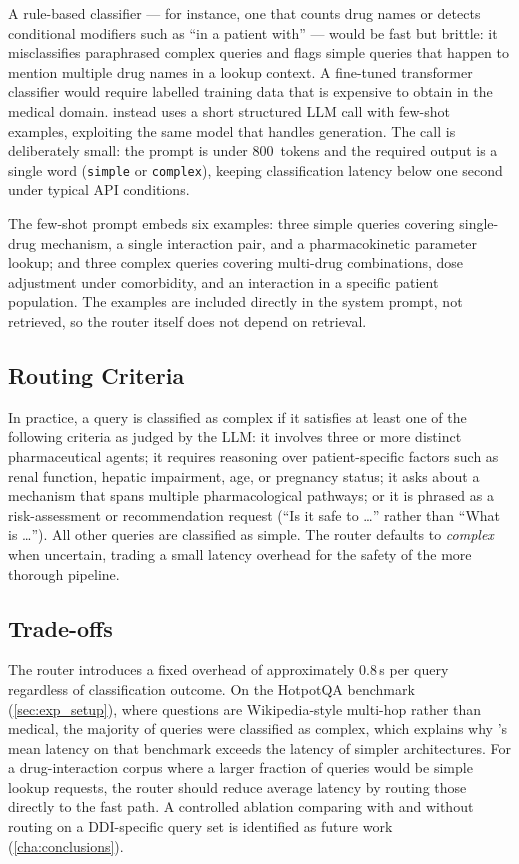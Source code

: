 A rule-based classifier --- for instance, one that counts drug names or detects
conditional modifiers such as ``in a patient with'' --- would be fast but brittle:
it misclassifies paraphrased complex queries and flags simple queries that
happen to mention multiple drug names in a lookup context.
A fine-tuned transformer classifier would require labelled training data that
is expensive to obtain in the medical domain.
\rarerag{} instead uses a short structured LLM call with few-shot examples,
exploiting the same model that handles generation.
The call is deliberately small: the prompt is under 800~tokens and the
required output is a single word (\texttt{simple} or \texttt{complex}),
keeping classification latency below one second under typical API conditions.

The few-shot prompt embeds six examples: three simple queries covering
single-drug mechanism, a single interaction pair, and a pharmacokinetic
parameter lookup; and three complex queries covering multi-drug combinations,
dose adjustment under comorbidity, and an interaction in a specific patient
population.
The examples are included directly in the system prompt, not retrieved,
so the router itself does not depend on retrieval.

\subsection{Routing Criteria}

In practice, a query is classified as complex if it satisfies at least one of the
following criteria as judged by the LLM: it involves three or more distinct
pharmaceutical agents; it requires reasoning over patient-specific factors such as
renal function, hepatic impairment, age, or pregnancy status; it asks about a mechanism
that spans multiple pharmacological pathways; or it is phrased as a risk-assessment
or recommendation request (``Is it safe to \ldots{}'' rather than ``What is \ldots{}'').
All other queries are classified as simple.
The router defaults to \textit{complex} when uncertain, trading a small
latency overhead for the safety of the more thorough pipeline.

\subsection{Trade-offs}

The router introduces a fixed overhead of approximately 0.8\,s per query
regardless of classification outcome.
On the HotpotQA benchmark (\cref{sec:exp_setup}), where questions are
Wikipedia-style multi-hop rather than medical, the majority of queries were
classified as complex, which explains why \rarerag{}'s mean latency on that
benchmark exceeds the latency of simpler architectures.
For a drug-interaction corpus where a larger fraction of queries would be
simple lookup requests, the router should reduce average latency by routing
those directly to the fast path.
A controlled ablation comparing \rarerag{} with and without routing on a
DDI-specific query set is identified as future work (\cref{cha:conclusions}).

